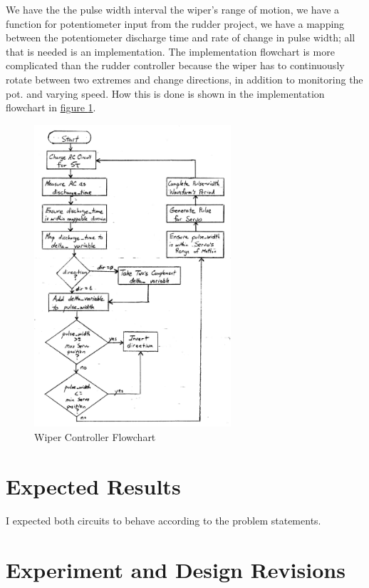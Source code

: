 \documentclass[11pt]{article}
\begin{document}
We have the the pulse width interval the wiper's range of motion,
we have a function for potentiometer input from the rudder project,
we have a mapping between the potentiometer discharge time and rate of change in pulse width;
all that is needed is an implementation. The implementation flowchart
is more complicated than the rudder controller because the wiper has to
continuously rotate between two extremes and change directions, in addition
to monitoring the pot. and varying speed. How this is done is shown in the
implementation flowchart in \hyperref[wiper-flowchart]{figure \ref{wiper-flowchart}}.

\begin{figure}[ht]
\centering
\includegraphics[width=0.65\textwidth]{wiper-flowchart.pdf}
\caption{Wiper Controller Flowchart}
\label{wiper-flowchart}
\end{figure}

\section{Expected Results}

I expected both circuits to behave according to the problem statements.

\section{Experiment and Design Revisions}
\end{document}
